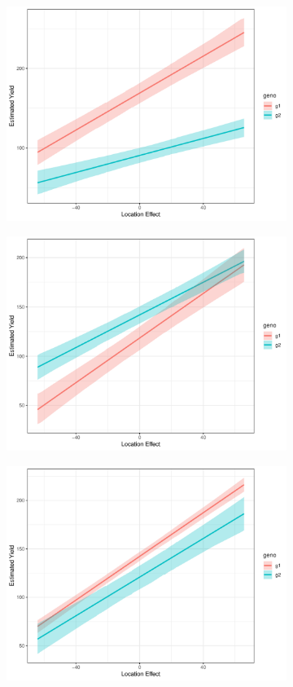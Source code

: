 \documentclass{beamer}
\begin{document}
\begin{frame}
\begin{figure}[H]
\begin{subfigure}{0.3\textwidth}
    \includegraphics[width=.9\linewidth]{fwpair_3.pdf}
    \caption{}
  \end{subfigure}
  \medskip

  \begin{subfigure}{0.3\textwidth}
    \centering
    \includegraphics[width=.9\linewidth]{fwpair_4.pdf}
    \caption{}
  \end{subfigure}
  \begin{subfigure}{0.3\textwidth}
    \centering
    \includegraphics[width=.9\linewidth]{fwpair_5.pdf}
    \caption{}
  \end{subfigure}


\end{figure}
\end{frame}
\end{document}
